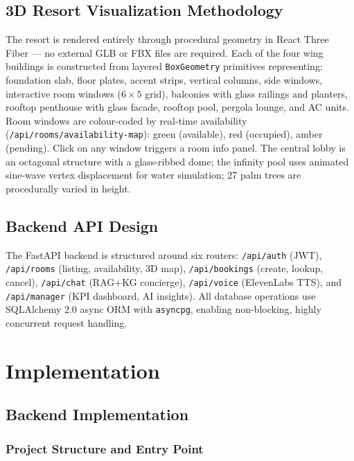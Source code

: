 \documentclass[11pt,a4paper]{report}
\begin{document}
\section{3D Resort Visualization Methodology}

The resort is rendered entirely through procedural geometry in React Three Fiber — no external GLB or FBX files are required. Each of the four wing buildings is constructed from layered \texttt{BoxGeometry} primitives representing: foundation slab, floor plates, accent strips, vertical columns, side windows, interactive room windows ($6 \times 5$ grid), balconies with glass railings and planters, rooftop penthouse with glass facade, rooftop pool, pergola lounge, and AC units. Room windows are colour-coded by real-time availability (\texttt{/api/rooms/availability-map}): green (available), red (occupied), amber (pending). Click on any window triggers a room info panel. The central lobby is an octagonal structure with a glass-ribbed dome; the infinity pool uses animated sine-wave vertex displacement for water simulation; 27 palm trees are procedurally varied in height.

\section{Backend API Design}

The FastAPI backend is structured around six routers: \texttt{/api/auth} (JWT), \texttt{/api/rooms} (listing, availability, 3D map), \texttt{/api/bookings} (create, lookup, cancel), \texttt{/api/chat} (RAG+KG concierge), \texttt{/api/voice} (ElevenLabs TTS), and \texttt{/api/manager} (KPI dashboard, AI insights). All database operations use SQLAlchemy 2.0 async ORM with \texttt{asyncpg}, enabling non-blocking, highly concurrent request handling.

\chapter{Implementation}

\section{Backend Implementation}

\subsection{Project Structure and Entry Point}
\end{document}
